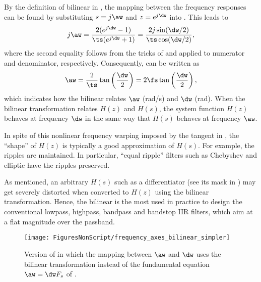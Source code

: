 By the definition of bilinear in , the mapping between the 
frequency responses can be found by substituting 
$s=j \aw$ and $z=e^{j\dw}$ 
 into . This leads to
\begin{equation}
j \aw = \frac{2(e^{j\dw}-1)}{\ts(e^{j\dw}+1)} = \frac{2 j \sin(\dw/2)}{\ts \cos(\dw/2)},
\label{eq:bilinearIntermediateResult}
\end{equation}
where the second equality follows from the tricks of  and  applied to numerator and denominator, respectively. Consequently,  can be written as
\begin{equation}
\aw = \frac{2}{\ts} \tan \left( \frac{\dw}{2} \right) = 2 \fs \tan \left( \frac{\dw}{2} \right),
\label{eq:prewarping}
\end{equation}
which indicates how the bilinear relates $\aw$ (rad/s) and $\dw$ (rad).
When the bilinear transformation relates $H(z)$ and $H(s)$, the system function $H(z)$ behaves at frequency $\dw$ in
the same way that $H(s)$ behaves at frequency $\aw$. 


In spite of this nonlinear frequency warping imposed by the tangent in , the ``shape'' of $H(z)$ is typically a good approximation of $H(s)$. 
For example, the ripples are maintained.
In particular, ``equal ripple'' filters such as Chebyshev and elliptic have the ripples preserved. 

As mentioned, an arbitrary $H(s)$ such as a differentiator (see its mask in ) may get severely distorted when converted to $H(z)$ using the bilinear transformation.
Hence, 
the bilinear is the most used in practice to design the conventional lowpass, highpass, bandpass and bandstop IIR filters, which aim at a flat magnitude over the passband.

\begin{figure}
\centering
\texttt{[image: FiguresNonScript/frequency\_axes\_bilinear\_simpler]}
\caption{Version of  in which the mapping between $\aw$ and $\dw$ uses the bilinear transformation instead of the fundamental equation $\aw = \dw F_s$ of .\label{fig:frequency_axes_bilinear_simpler}}
\end{figure}

